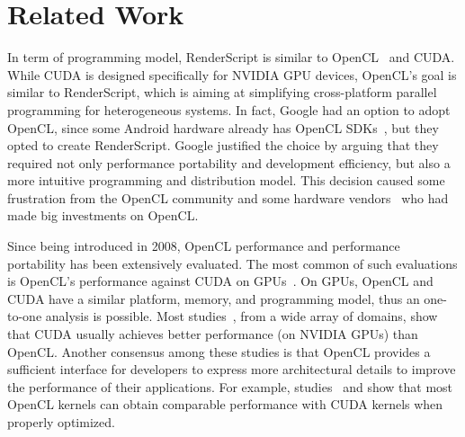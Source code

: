 \section{Related Work}

In term of programming model, RenderScript is similar to OpenCL~\cite{OpenCL}
and CUDA. While CUDA is designed specifically for NVIDIA GPU devices, OpenCL's
goal is similar to RenderScript, which is aiming at simplifying cross-platform
parallel programming for heterogeneous systems.  In fact, Google had an option
to adopt OpenCL, since some Android hardware already has OpenCL
SDKs~\cite{OpenCL:Android}, but they opted to create RenderScript.  Google
justified the choice by arguing that they required not only performance
portability and development efficiency, but also a more intuitive programming
and distribution model.  This decision caused some frustration from the OpenCL
community \cite{androidblockopenCL} and some hardware
vendors~\cite{googlelockin} who had made big investments on OpenCL.

Since being introduced in 2008, OpenCL performance and performance portability
has been extensively evaluated.  The most common of such evaluations is OpenCL's
performance against CUDA on GPUs~\cite{fang2011comprehensive,
weber2011comparing, van2011correlating, vassilev2010comparison,
amorim2009comparing, karimi2010performance, komatsu2010evaluating}.  On
GPUs, OpenCL and CUDA have a similar platform, memory, and programming model,
thus an one-to-one analysis is possible.  Most studies~\cite{weber2011comparing,
van2011correlating, vassilev2010comparison, amorim2009comparing}, from a wide
array of domains, show that CUDA usually achieves better performance (on NVIDIA
GPUs) than OpenCL.  Another consensus among these studies is that OpenCL
provides a sufficient interface for developers to express more architectural
details to improve the performance of their applications.  For example,
studies~\cite{komatsu2010evaluating} and \cite{fang2011comprehensive} show that
most OpenCL kernels can obtain comparable performance with CUDA kernels when
properly optimized.

